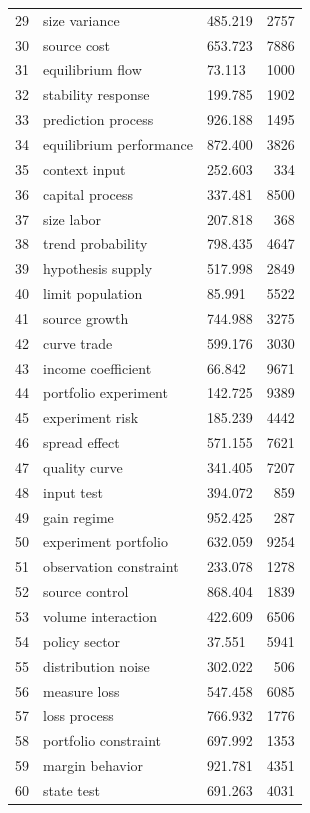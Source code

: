 \documentclass[11pt]{report}
\begin{document}
\begin{longtable}{rllr}
29 & size variance & 485.219 & 2757 \\
30 & source cost & 653.723 & 7886 \\
31 & equilibrium flow & 73.113 & 1000 \\
32 & stability response & 199.785 & 1902 \\
33 & prediction process & 926.188 & 1495 \\
34 & equilibrium performance & 872.400 & 3826 \\
35 & context input & 252.603 & 334 \\
36 & capital process & 337.481 & 8500 \\
37 & size labor & 207.818 & 368 \\
38 & trend probability & 798.435 & 4647 \\
39 & hypothesis supply & 517.998 & 2849 \\
40 & limit population & 85.991 & 5522 \\
41 & source growth & 744.988 & 3275 \\
42 & curve trade & 599.176 & 3030 \\
43 & income coefficient & 66.842 & 9671 \\
44 & portfolio experiment & 142.725 & 9389 \\
45 & experiment risk & 185.239 & 4442 \\
46 & spread effect & 571.155 & 7621 \\
47 & quality curve & 341.405 & 7207 \\
48 & input test & 394.072 & 859 \\
49 & gain regime & 952.425 & 287 \\
50 & experiment portfolio & 632.059 & 9254 \\
51 & observation constraint & 233.078 & 1278 \\
52 & source control & 868.404 & 1839 \\
53 & volume interaction & 422.609 & 6506 \\
54 & policy sector & 37.551 & 5941 \\
55 & distribution noise & 302.022 & 506 \\
56 & measure loss & 547.458 & 6085 \\
57 & loss process & 766.932 & 1776 \\
58 & portfolio constraint & 697.992 & 1353 \\
59 & margin behavior & 921.781 & 4351 \\
60 & state test & 691.263 & 4031 \\
\end{longtable}
\end{document}
